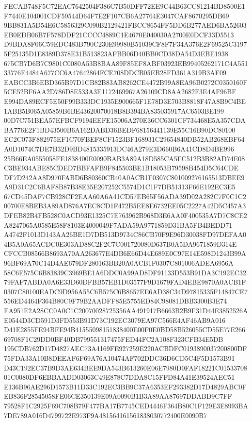 \documentclass[UTF8,fontset=fandol,zihao=-4,a4paper]{ctexart}
\begin{document}
{{FECAB748F5C72EAC7642504F386C7B50DFF72EE9C44B63CC81214BD8500E1F7440E104001CDF59544D64F7E2F107CB6A27764E3047CAF8670295DB69
9BB831A5D54E6C5856329C090B2129421FBCC8654FF5DD6B277AED6BA52603EB0EDB06B7F578DDF21CCCC4889C1E4670E040030A2700E0DCF33D5513
D9BDA8F06C59EDC483B790C230E99980B51039CF8F7F34A376E2F69525C31975F25135D1E8389D378E31B513823AFBB06D40BB0CD38DA54D3EBE1938
675CB7D6B7C9801C0080A53B8BAA89F85EF8ABF03923EB99405262171C4A55133776E4484A677CC6A47642864FCE708DDCB05EB28FD361A319B3AF09
EABCC3B6EBD365B97D1CB82B83AB8262CE4472B99A8EA96B0272C0350160F5CE52BF6AA2D786D8E533A3E1172469967A26109CD8AA2682F3E4AF96BF
E994DA89ECF5E50F99B333DC1935E900665F1E78D3E703B8818F47A8B9C4BE1ABB5B065A05859B6BE43620070018B8B394BA835035917AC6503BE199
00D7C751BEA57EFBCF9194EEFE15006A270E36CC6301CF734468E5A357CDABA776E2F1BD43500B6A162DABD36BEDF68156441139E55C16B90DC80100
EC2C073F882975EF1C70FBEF8CF1523BF168931C29654840DB52AB268EBF64A0D1074C7DE7B32D9BD4815335913DC46A279E3D660B6A41CD8D4BE996
25B66EA0555058FE1838400E0090BAB3A89A18D585CA5FC512B3B82AD74E08C3BE934ABE85CDED7BBFAFB9F845503BE1B18053B79598B454D5C64CDE
DF7D242AA8D970FABD6B80360CB40A0ACB1F0307C801009276165513DBEE9A9D31C2C6BAF8B87B38E35E207252C5574D1C1F7DB51313F66E192EC3E5
67CD45DAF7CB928CF2EAA60A6A41CD57EB65F56ADA39D02A282C7F0C1C200700E8BEB3A89AD876A7EC8CD1F472B5EE8E6732EE05C2227A42D5C457A3
DFEB82B4FB528C0ACD93E1325C7E763962B968D3E6AA0F400535A7D7C8CE2A8247065A0585E58F8103E4000049F7ADA59A9771859D31BA5FB4BEDD71
A4742F1013D143AA26BE1D7DB513D9734C86CB70F9E96D30038FD97DEFAA04B5A0A65ACDC0E303AD88C2F2C7C001720080D637B0A5DA9671859D314E
CFCCB08566B8693A70AA263677E4DB6E66D44E689E0C97E14E598D1243B99A96BF69A70C14D4AE679DF280163BB20A0ACB1F0307C801006ADEA6956A
58C6E575C6B83839C3969BE1A6DDC0A99AD8DF91133D553B91DA3C192EC3279FAF7ABDA0A6E33D60DFBB57EB1D03577F9D1679FAD4EBE9870A0ACB1F
0307C80100EADC9D956A55C6B575C6B8657EE6AD38C34D97815335F14847CE7556ED4464F364B80C9F79B2AADFF85E5755ED84C98081DBB3300B3E74
EA951E2A28CC0A0C1C20070028725356AA491917B6663B2B9F31D44E3852526AE0544D3CD591D3FD553B91D73C192EC3079EA97C566E4AF46AB9A016
D41E2855FE94BFE94B41555098151838400E00F0E0BD58B526055CD55E77E26669708F1C29DD0BF40DB799551317475FED44FC2A108F323CFB34E5DB
195CDB762D17D4827AEC73A4169FE927259E220ACBDFC0193890037200800DF75FDA33A10B8DEEAF6F69A76A10474AF702DDC36D6CD5C4F5D1573B91
D43C192EC37B9D3AE634BEE9DA543B613260E06E7980D0FAF18221C0153370801C0080DF6EBBAADD03063C49E878C7DDA8C15FFD84A41E39524AEC51
E136B96AE296D1573B11D33C192EC3BB9C37A6353EF293382D17D4829ABC0FEB836F28545058FE06CE350139E09A0090B1B3A89AA87697DDABD9C7FF
79528F1C2925F69C708B79F477BA17B7745CED4446F364B80C1F129E3E8993BA7DE789A016D4799722E973F9A481564161561838030772400E0090B7
}}
\end{document}
